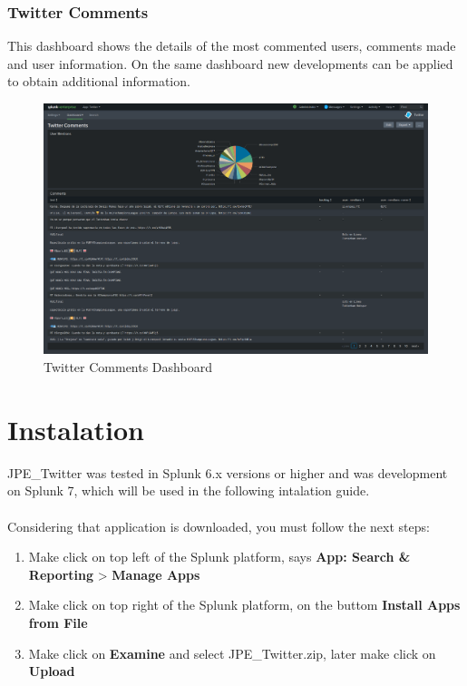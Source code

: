 \documentclass[report]{article}
\begin{document}
\newpage

\subsubsection{Twitter Comments}
This dashboard shows the details of the most commented users, comments made and user information. On the same dashboard new developments can be applied to obtain additional information.
\newline
\begin{figure}[h!]
	\centering
	\includegraphics[scale=0.2]{img/comments.png}
	\caption{\color{text}Twitter Comments Dashboard}
\end{figure}

\newpage

\section{Instalation}
JPE\_Twitter was tested in Splunk 6.x versions or higher and was development on Splunk 7, which will be used in the following intalation guide.\\
\\
Considering that application is downloaded, you must follow the next steps:
\newline
\begin{enumerate}[label=(\alph*)]
\item Make click on top left of the Splunk platform, says \textbf{App: Search \& Reporting} > \textbf{Manage Apps}
\item Make click on top right of the Splunk platform, on the buttom \textbf{Install Apps from File}
\item Make click on \textbf{Examine} and select JPE\_Twitter.zip, later make click on \textbf{Upload}
\newline
\end{enumerate}
\end{document}
